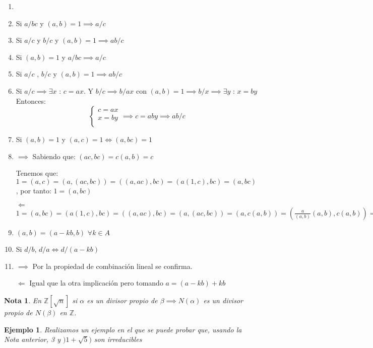 \documentclass[11pt, a4paper, titlepage]{article}
\makeatletter
\renewenvironment{proof}[1][\proofname] {\vspace{-15pt}\par\pushQED{\qed}\normalfont\topsep6\p@\@plus6\p@\relax\trivlist\item[\hskip\labelsep\it#1\@addpunct{.}]\ignorespaces}{\popQED\endtrivlist\@endpefalse}
\theoremstyle{theorem-style}
\theoremstyle{definition-style}
\theoremstyle{remark-style}
\newtheorem*{nota}{Nota}
\theoremstyle{example-style}
\newtheorem*{ejemplo}{Ejemplo}
\newenvironment{nlist}
{\begin{enumerate}
\renewcommand\labelenumi{(\emph{\roman{enumi})}}}
{\end{enumerate}}
\makeatother
\begin{document}
\begin{nlist}
\begin{proof}
\end{proof}

\item Si $a/bc$ y $(a,b) = 1 \implies a/c$ 

\item Si $a/c$ y $b/c$ y $(a,b) = 1 \implies ab/c$
	\item Si $(a,b)=1 $ y $a/bc \implies a/c$
	\item Si $a/c$ , $b/c$ y $(a,b)=1 \implies ab/c$
	\item Si $a/c \implies \exists x$ : $c=ax$. Y $b/c \implies b/ax$ con $(a,b)=1 \implies b/x \implies \exists y$ : $x=by$
	Entonces: 
	\[
		\begin{cases}
			c=ax \\
			x=by \\
		\end{cases} \implies c=aby \implies ab/c
	\]
	\item Si $(a,b)=1$ y $(a,c)=1 \iff (a,bc)=1$ \\
	\begin{proof}
	$\boxed{\implies}$ Sabiendo que: $(ac,bc)=c(a,b)=c$
	
	Tenemos que: $1=(a,c)=(a,(ac,bc))=((a,ac),bc)=(a(1,c),bc)=(a,bc)$, por tanto: $1=(a,bc)$
	
	$\boxed{\Longleftarrow}$ $1=(a,bc)=(a(1,c),bc)=((a,ac),bc)=(a,(ac,bc))=(a,c(a,b))=(\frac{a}{(a,b)}(a,b),c(a,b))=(a,b)(\frac{a}{(a,b)},c)=1 \implies (a,b)\in U(A)\implies (a,b)=1\implies (a,c)\in U(A)\implies (a,c)=1$
\end{proof}
	\item $(a,b)=(a-kb,b)$ $\forall k \in A$
	\item Si $d/b$, $d/a \iff d/(a-kb)$ \\
	\begin{proof}
	$\boxed{\implies}$ Por la propiedad de combinación lineal se confirma.
	
	$\boxed{\Longleftarrow}$ Igual que la otra implicación pero tomando $a=(a-kb)+kb$
	\end{proof}
\end{nlist}

\begin{nota}
En $\mathbb{Z}[\sqrt{n}]$ si $\alpha$ es un divisor propio de $\beta \implies N(\alpha)$ es un divisor propio de $N(\beta)$ en $\mathbb{Z}$.
\end{nota}

\begin{ejemplo}
Realizamos un ejemplo en el que se puede probar que, usando la Nota anterior, 3 y $)1+\sqrt{5})$ son irreducibles	
\end{ejemplo}
\end{document}
